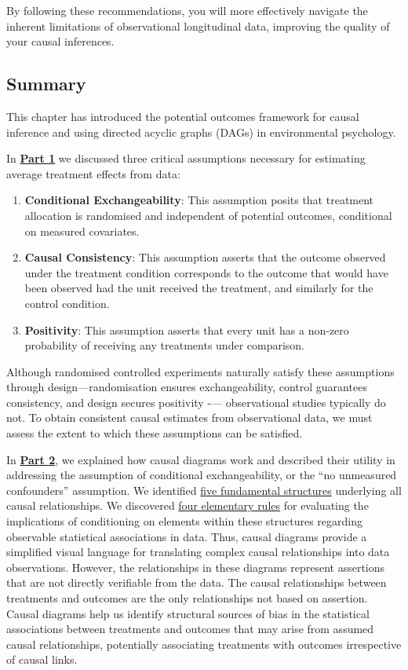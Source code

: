\documentclass[
  singlecolumn]{article}
\providecommand{\tightlist}{%
  \setlength{\itemsep}{0pt}\setlength{\parskip}{0pt}}\usepackage{longtable,booktabs,array}
\begin{document}
By following these recommendations, you will more effectively navigate
the inherent limitations of observational longitudinal data, improving
the quality of your causal inferences.

\subsection{Summary}\label{summary}

This chapter has introduced the potential outcomes framework for causal
inference and using directed acyclic graphs (DAGs) in environmental
psychology.

In \hyperref[section-part1]{\textbf{Part 1}} we discussed three critical
assumptions necessary for estimating average treatment effects from
data:

\begin{enumerate}
\def\labelenumi{\arabic{enumi}.}
\tightlist
\item
  \textbf{Conditional Exchangeability}: This assumption posits that
  treatment allocation is randomised and independent of potential
  outcomes, conditional on measured covariates.
\item
  \textbf{Causal Consistency}: This assumption asserts that the outcome
  observed under the treatment condition corresponds to the outcome that
  would have been observed had the unit received the treatment, and
  similarly for the control condition.
\item
  \textbf{Positivity}: This assumption asserts that every unit has a
  non-zero probability of receiving any treatments under comparison.
\end{enumerate}

Although randomised controlled experiments naturally satisfy these
assumptions through design---randomisation ensures exchangeability,
control guarantees consistency, and design secures positivity -\/---
observational studies typically do not. To obtain consistent causal
estimates from observational data, we must assess the extent to which
these assumptions can be satisfied.

In \hyperref[section-part2]{\textbf{Part 2}}, we explained how causal
diagrams work and described their utility in addressing the assumption
of conditional exchangeability, or the ``no unmeasured confounders''
assumption. We identified \hyperref[sec-five-elementary]{five
fundamental structures} underlying all causal relationships. We
discovered \hyperref[sec-four-rules]{four elementary rules} for
evaluating the implications of conditioning on elements within these
structures regarding observable statistical associations in data. Thus,
causal diagrams provide a simplified visual language for translating
complex causal relationships into data observations. However, the
relationships in these diagrams represent assertions that are not
directly verifiable from the data. The causal relationships between
treatments and outcomes are the only relationships not based on
assertion. Causal diagrams help us identify structural sources of bias
in the statistical associations between treatments and outcomes that may
arise from assumed causal relationships, potentially associating
treatments with outcomes irrespective of causal links.
\end{document}
